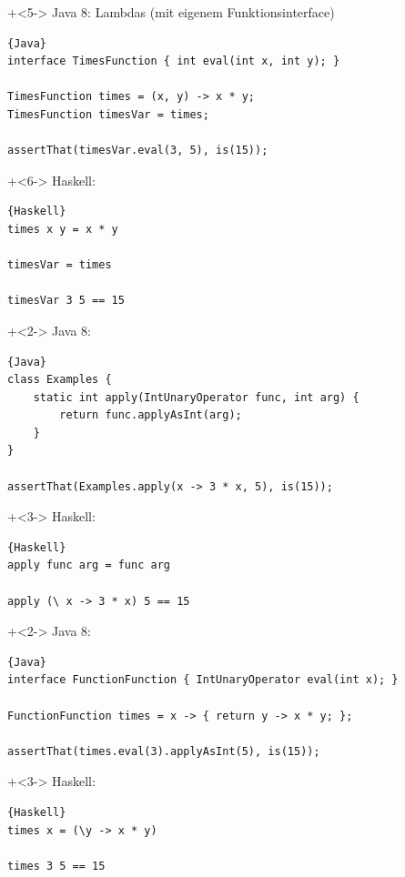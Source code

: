 \begin{frame}[fragile]{}
\onslide+<5->
Java 8: Lambdas (mit eigenem Funktionsinterface)
\begin{lstlisting}{Java}
interface TimesFunction { int eval(int x, int y); }

TimesFunction times = (x, y) -> x * y;
TimesFunction timesVar = times;

assertThat(timesVar.eval(3, 5), is(15));
\end{lstlisting}
\onslide+<6->
Haskell:
\begin{lstlisting}{Haskell}
times x y = x * y

timesVar = times

timesVar 3 5 == 15
\end{lstlisting}

\end{frame}

\begin{frame}[fragile]{}
\onslide+<2->
Java 8:
\begin{lstlisting}{Java}
class Examples { 
    static int apply(IntUnaryOperator func, int arg) { 
        return func.applyAsInt(arg); 
    }
}

assertThat(Examples.apply(x -> 3 * x, 5), is(15));
\end{lstlisting}

\onslide+<3->
Haskell:
\begin{lstlisting}{Haskell}
apply func arg = func arg

apply (\ x -> 3 * x) 5 == 15
\end{lstlisting}

\end{frame}

\begin{frame}[fragile]{}
\onslide+<2->
Java 8:
\begin{lstlisting}{Java}
interface FunctionFunction { IntUnaryOperator eval(int x); }

FunctionFunction times = x -> { return y -> x * y; };

assertThat(times.eval(3).applyAsInt(5), is(15));
\end{lstlisting}

\onslide+<3->
Haskell:
\begin{lstlisting}{Haskell}
times x = (\y -> x * y)

times 3 5 == 15
\end{lstlisting}

\end{frame}

